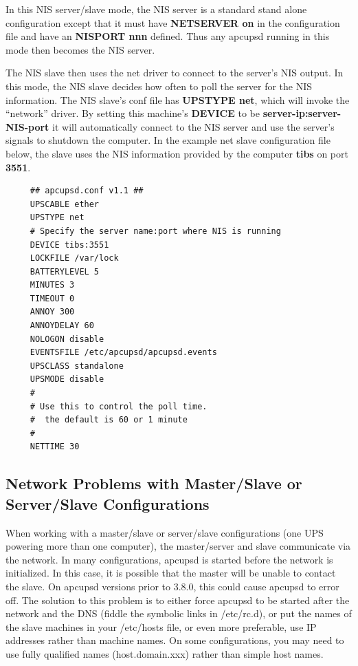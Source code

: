 {{{{{{{{In this NIS server/slave mode, the NIS server is a standard stand alone
configuration except that it must have {\bf NETSERVER on} in the configuration
file and have an {\bf NISPORT nnn} defined. Thus any apcupsd running in this
mode then becomes the NIS server.  

The NIS slave then uses the net driver to connect to the server's NIS output.
In this mode, the NIS slave decides how often to poll the server for the NIS
information. The NIS slave's conf file has {\bf UPSTYPE net}, which will
invoke the ``network'' driver. By setting this machine's {\bf DEVICE} to be
{\bf server-ip:server-NIS-port} it will automatically connect to the NIS
server and use the server's signals to shutdown the computer.  In the example
net slave configuration file below, the slave uses the NIS information
provided by the computer {\bf tibs} on port {\bf 3551}. 

\footnotesize
\begin{verbatim}
     ## apcupsd.conf v1.1 ##
     UPSCABLE ether
     UPSTYPE net
     # Specify the server name:port where NIS is running
     DEVICE tibs:3551
     LOCKFILE /var/lock
     BATTERYLEVEL 5
     MINUTES 3
     TIMEOUT 0
     ANNOY 300
     ANNOYDELAY 60
     NOLOGON disable
     EVENTSFILE /etc/apcupsd/apcupsd.events
     UPSCLASS standalone
     UPSMODE disable
     #
     # Use this to control the poll time.
     #  the default is 60 or 1 minute
     #
     NETTIME 30
\end{verbatim}
\normalsize

\label{Network-Problems-with-Master_002fSlave-or-Server_002fSlave-Configuratio%
ns}

\subsection*{Network Problems with Master/Slave or Server/Slave
Configurations}

\label{index-Problems_002c-Master_002fSlave-159}
\label{index-Problems_002c-networking-160}
When working with a master/slave or server/slave configurations (one UPS
powering more than one computer), the master/server and slave communicate via
the network. In many configurations, apcupsd is started before the network is
initialized. In this case, it is possible that the master will be unable to
contact the slave. On apcupsd versions prior to 3.8.0, this could cause
apcupsd to error off. The solution to this problem is to either force apcupsd
to be started after the network and the DNS (fiddle the symbolic links in
/etc/rc.d), or put the names of the slave machines in your /etc/hosts file, or
even more preferable, use IP addresses rather than machine names. On some
configurations, you may need to use fully qualified names (host.domain.xxx)
rather than simple host names. 

}}}}}}}}
